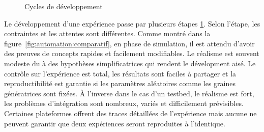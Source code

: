 \begin{figure}
\caption{Cycles de développement}\label{fig:automation:development_workflow}
\end{figure}

Le développement d'une expérience passe par plusieurs étapes
\ref{fig:automation:development_workflow}. Selon l'étape, les contraintes et
les attentes sont différentes. Comme montré dans la
figure~\ref{fig:automation:comparatif}, en phase de simulation, il est attendu
d'avoir des preuves de concepts rapides et facilement modifiables. Le réalisme
est souvent modeste du à des hypothèses simplificatrices qui rendent le
dévelopment aisé. Le contrôle sur l'expérience est total, les résultats sont
faciles à partager et la reproductibilité est garantie si les paramètres
aléatoires comme les graines génératrices sont fixées. À l'inverse dans le cas
d'un testbed, le réalisme est fort, les problèmes d'intégration sont nombreux,
variés et difficilement prévisibles. Certaines plateformes offrent des traces
détaillées de l'expérience mais aucune ne peuvent garantir que deux
expériences seront reproduites à l'identique.

